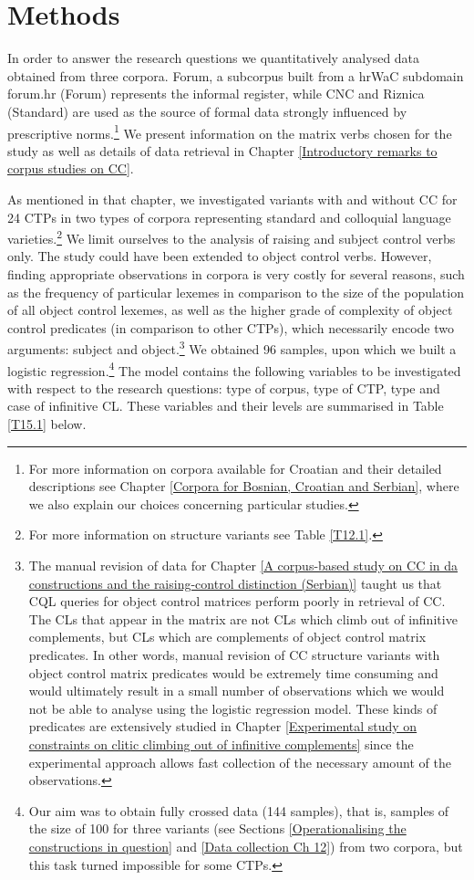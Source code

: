 \section{Methods}
\label{Methods}
In order to answer the research questions we quantitatively analysed data obtained from three corpora. Forum, a subcorpus built from a hrWaC subdomain forum.hr (Forum) represents the informal register, while CNC and Riznica (Standard) are used as the source of formal data strongly influenced by prescriptive norms.\footnote{For more information on corpora available for Croatian and their detailed descriptions see Chapter \ref{Corpora for Bosnian, Croatian and Serbian}, where we also explain our choices concerning particular studies.} We present information on the matrix verbs chosen for the study as well as details of data retrieval in Chapter \ref{Introductory remarks to corpus studies on CC}. 

As mentioned in that chapter, we investigated variants with and without CC for 24 CTPs in two types of corpora representing standard and colloquial language varieties.\footnote{For more information on structure variants see Table \ref{T12.1}.} We limit ourselves to the analysis of raising and subject control verbs only. The study could have been extended to object control verbs. However, finding appropriate observations in corpora is very costly for several reasons, such as the frequency of particular lexemes in comparison to the size of the population of all object control lexemes, as well as the higher grade of complexity of object control predicates (in comparison to other CTPs), which necessarily encode two arguments: subject and object.\footnote{The manual revision of data for Chapter \ref{A corpus-based study on CC in da constructions and the raising-control distinction (Serbian)} taught us that CQL queries for object control matrices perform poorly in retrieval of CC. The CLs that appear in the matrix are not CLs which climb out of infinitive complements, but CLs which are complements of object control matrix predicates. In other words, manual revision of CC structure variants with object control matrix predicates would be extremely time consuming and would ultimately result in a small number of observations which we would not be able to analyse using the logistic regression model. These kinds of predicates are extensively studied in Chapter \ref{Experimental study on constraints on clitic climbing out of infinitive complements} since the experimental approach allows fast collection of the necessary amount of the observations.} We obtained 96 samples, upon which we built a logistic regression.\footnote{Our aim was to obtain fully crossed data (144 samples), that is, samples of the size of 100 for three variants (see Sections \ref{Operationalising the constructions in question} and \ref{Data collection Ch 12}) from two corpora, but this task turned impossible for some CTPs.} The model contains the following variables to be investigated with respect to the research questions: type of corpus, type of CTP, type and case of infinitive CL. These variables and their levels are summarised in Table \ref{T15.1} below.

